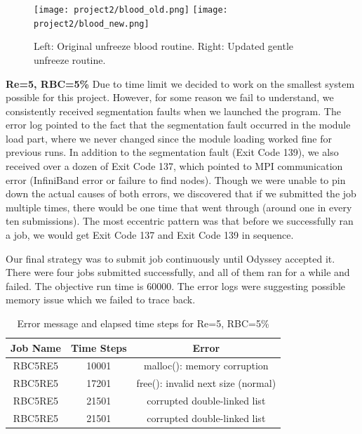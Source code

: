 \documentclass[11pt]{article} %
\begin{document}
\begin{figure}[H]
    \centering
    \texttt{[image: project2/blood\_old.png]}
    \texttt{[image: project2/blood\_new.png]}
    \caption{Left: Original unfreeze blood routine. Right: Updated gentle unfreeze routine.}
    \label{fig:my_label}
\end{figure}


\textbf{Re=5, RBC=5\%}
Due to time limit we decided to work on the smallest system possible for this project. However, for some reason we fail to understand, we consistently received segmentation faults when we launched the program. The error log pointed to the fact that the segmentation fault occurred in the module load part, where we never changed since the module loading worked fine for previous runs. In addition to the segmentation fault (Exit Code 139), we also received over a dozen of Exit Code 137, which pointed to MPI communication error (InfiniBand error or failure to find nodes). Though we were unable to pin down the actual causes of both errors, we discovered that if we submitted the job multiple times, there would be one time that went through (around one in every ten submissions). The most eccentric pattern was that before we successfully ran a job, we would get Exit Code 137 and Exit Code 139 in sequence.

Our final strategy was to submit job continuously until Odyssey accepted it. There were four jobs submitted successfully, and all of them ran for a while and failed. The objective run time is 60000. The error logs were suggesting possible memory issue which we failed to trace back.

\begin{table}[H]
\centering
\begin{tabular}{|c|c|c|}
\hline
\textbf{Job Name} & \textbf{Time Steps} & \textbf{Error}                     \\ \hline
RBC5RE5           & 10001             & malloc(): memory corruption        \\ \hline
RBC5RE5           & 17201          & free(): invalid next size (normal) \\ \hline
RBC5RE5           & 21501          & corrupted double-linked list       \\ \hline
RBC5RE5           & 21501             & corrupted double-linked list       \\ \hline
\end{tabular}
\caption{Error message and elapsed time steps for Re=5, RBC=5\%}
\end{table}
\end{document}
